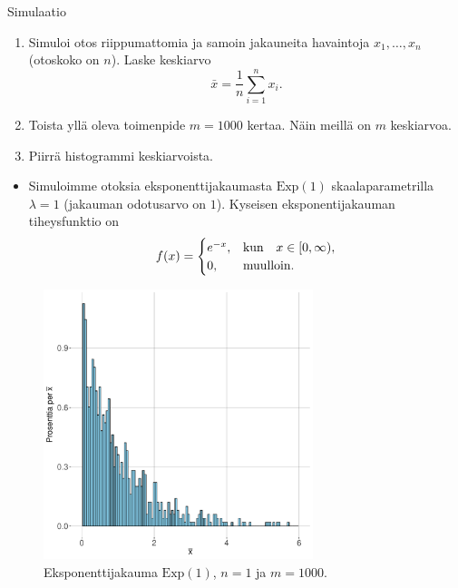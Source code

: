 \documentclass{beamer}
\begin{document}

\begin{frame}{Simulaatio}
  \begin{enumerate}
    \item Simuloi otos riippumattomia ja samoin jakauneita havaintoja $x_1,
    \ldots, x_n$ (otoskoko on $n$). Laske keskiarvo
    \begin{equation*}
      \bar x = \frac{1}{n}\sum_{i=1}^n x_i.
    \end{equation*}
    \pause
    \item Toista yllä oleva toimenpide $m = 1000$ kertaa. Näin meillä on $m$
    keskiarvoa.
    \pause
    \item Piirrä histogrammi keskiarvoista.
  \end{enumerate}
\end{frame}


\begin{frame}
  \begin{itemize}
    \item Simuloimme otoksia eksponenttijakaumasta $\mathrm{Exp}(1)$
    skaalaparametrilla $\lambda = 1$ (jakauman odotusarvo on $1$). Kyseisen
    eksponentijakauman tiheysfunktio on
    \begin{equation*}
      f(x) =
      \begin{cases}
        e^{-x}, &\textnormal{kun}\quad x\in[0,\infty), \\
        0, &\textnormal{muulloin}. 
      \end{cases}
    \end{equation*}
  \end{itemize}
\end{frame}


\begin{frame}
  \begin{center}
    \begin{figure}
      \includegraphics[width=0.7\textwidth, height=0.7\textwidth]{exp-n-1.pdf}
      \caption{Eksponenttijakauma $\mathrm{Exp}\left(1\right)$, $n = 1$ ja $m = 1000$.}
  \end{figure}
\end{center}
\end{frame}
\end{document}
